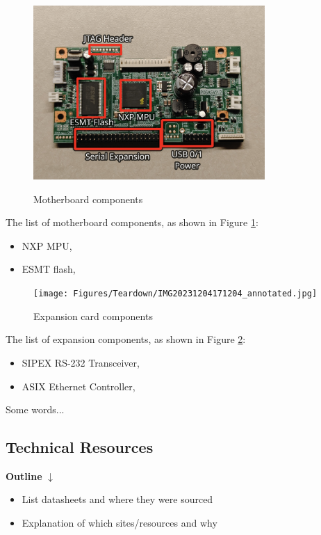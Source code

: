 \begin{figure}[ht]
    \centering
    {\includegraphics[width=88mm,scale=0.5]
    {Figures/Teardown/IMG20231204171516_annotated.jpg}}
    \caption{Motherboard components}
    \label{fig:snbc_btp_s80_motherboard}
\end{figure}

The list of motherboard components, as shown in Figure \ref{fig:snbc_btp_s80_motherboard}:
\begin{itemize}
    \item NXP MPU, 
    \item ESMT flash, 
\end{itemize}

\begin{figure}[ht]
    \centering
    {\texttt{[image: Figures/Teardown/IMG20231204171204\_annotated.jpg]}}
    \caption{Expansion card components}
    \label{fig:snbc_btp_s80_expansion_components}
\end{figure}

The list of expansion components, as shown in Figure \ref{fig:snbc_btp_s80_expansion_components}:
\begin{itemize}
    \item SIPEX RS-232 Transceiver, 
    \item ASIX Ethernet Controller, 
\end{itemize}

Some words...

\subsection{Technical Resources} \label{technicalresources}


\textbf{Outline}
$\downarrow$

\begin{itemize}
    \item List datasheets and where they were sourced
    \item Explanation of which sites/resources and why
\end{itemize}

